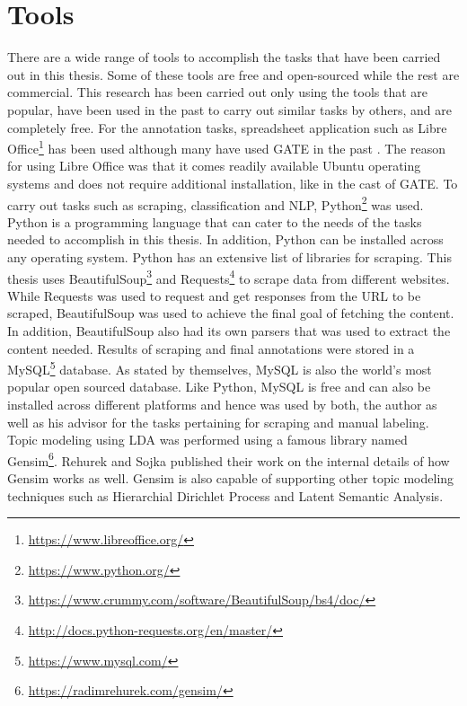 \documentclass[a4paper,12pt,twoside]{report}
\begin{document}
\section{Tools}
There are a wide range of tools to accomplish the tasks that have been carried out in this thesis. Some of these tools are free and open-sourced while the rest are commercial. This research has been carried out only using the tools that are popular, have been used in the past to carry out similar tasks by others, and are completely free. 
\bigbreak
For the annotation tasks, spreadsheet application such as Libre Office\footnote{\url{https://www.libreoffice.org/}} has been used although many have used GATE in the past \cite{Lata2016}\cite{Nonnenmacher2017}. The reason for using Libre Office was that it comes readily available Ubuntu operating systems and does not require additional installation, like in the cast of GATE. 
\bigbreak
To carry out tasks such as scraping, classification and NLP, Python\footnote{\url{https://www.python.org/}} was used. Python is a programming language that can cater to the needs of the tasks needed to accomplish in this thesis. In addition, Python can be installed across any operating system. Python has an extensive list of libraries for scraping. This thesis uses BeautifulSoup\footnote{\url{https://www.crummy.com/software/BeautifulSoup/bs4/doc/}} and Requests\footnote{\url{http://docs.python-requests.org/en/master/}} to scrape data from different websites. While Requests was used to request and get responses from the URL to be scraped, BeautifulSoup was used to achieve the final goal of fetching the content. In addition, BeautifulSoup also had its own parsers that was used to extract the content needed.
\bigbreak
Results of scraping and final annotations were stored in a MySQL\footnote{\url{https://www.mysql.com/}} database. As stated by themselves, MySQL is also the world's most popular open sourced database. Like Python, MySQL is free and can also be installed across different platforms and hence was used by both, the author as well as his advisor for the tasks pertaining for scraping and manual labeling. 
\bigbreak
Topic modeling using LDA was performed using a famous library named Gensim\footnote{\url{https://radimrehurek.com/gensim/}}. Rehurek and Sojka \cite{Rehurek2010} published their work on the internal details of how Gensim works as well. Gensim is also capable of supporting other topic modeling techniques such as Hierarchial Dirichlet Process and Latent Semantic Analysis. 
\bigbreak
\end{document}
